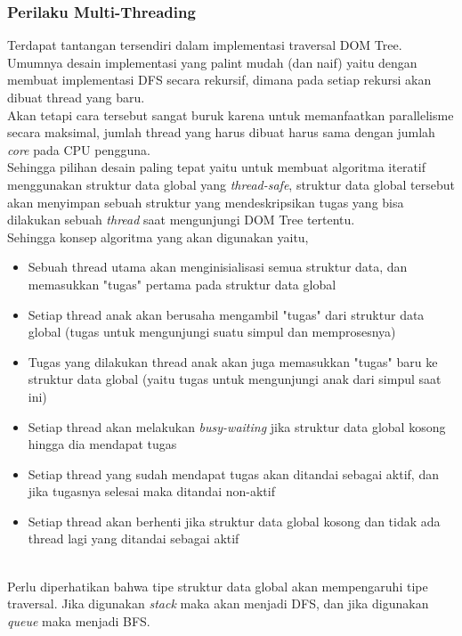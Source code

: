 \documentclass[12pt,a4paper]{article}
\begin{document}
\begin{itemize}
\subsubsection{Perilaku Multi-Threading}

Terdapat tantangan tersendiri dalam implementasi traversal DOM Tree. Umumnya desain implementasi yang palint mudah (dan naif) yaitu
dengan membuat implementasi DFS secara rekursif, dimana pada setiap rekursi akan dibuat thread yang baru. \\

Akan tetapi cara tersebut sangat buruk karena untuk memanfaatkan parallelisme secara maksimal, 
jumlah thread yang harus dibuat harus sama dengan jumlah \textit{core} pada CPU pengguna. \\

Sehingga pilihan desain paling tepat yaitu untuk membuat algoritma iteratif menggunakan struktur data global yang \textit{thread-safe},
struktur data global tersebut akan menyimpan sebuah struktur yang mendeskripsikan tugas yang bisa dilakukan sebuah \textit{thread} saat mengunjungi DOM Tree tertentu. \\

Sehingga konsep  algoritma yang akan digunakan yaitu,
\begin{itemize}
    \item Sebuah thread utama akan menginisialisasi semua struktur data, dan memasukkan "tugas" pertama pada struktur data global
    \item Setiap thread anak akan berusaha mengambil "tugas" dari struktur data global (tugas untuk mengunjungi suatu simpul dan memprosesnya)
    \item Tugas yang dilakukan thread anak akan juga memasukkan "tugas" baru ke struktur data global (yaitu tugas untuk mengunjungi anak dari simpul saat ini)
    \item Setiap thread akan melakukan \textit{busy-waiting} jika struktur data global kosong hingga dia mendapat tugas
    \item Setiap thread yang sudah mendapat tugas akan ditandai sebagai aktif, dan jika tugasnya selesai maka ditandai non-aktif
    \item Setiap thread akan berhenti jika struktur data global kosong dan tidak ada thread lagi yang ditandai sebagai aktif
\end{itemize} \\


Perlu diperhatikan bahwa tipe struktur data global akan mempengaruhi tipe traversal. 
Jika digunakan \textit{stack} maka akan menjadi DFS, dan jika digunakan \textit{queue} maka menjadi BFS. \\



\end{itemize}
\end{document}

